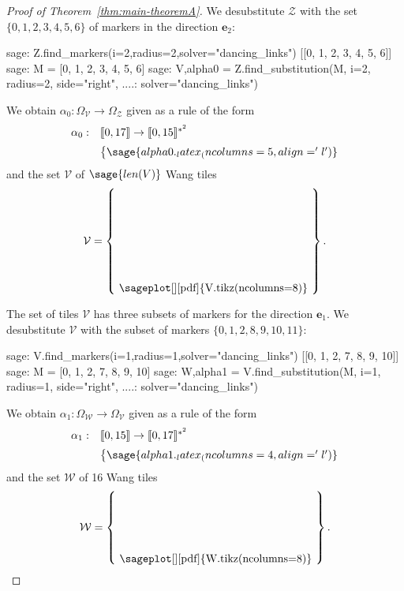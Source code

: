 \documentclass[12pt]{amsart}
\newcommand{\be}{{\boldsymbol{e}}}
\newcommand{\Vcal}{\mathcal{V}}
\newcommand{\Wcal}{\mathcal{W}}
\newcommand{\Zcal}{\mathcal{Z}}
\newcommand{\Zrange}[1]{\llbracket0,#1\rrbracket}
\begin{document}
\begin{proof}[Proof of Theorem~\ref{thm:main-theoremA}]
    We desubstitute $\Zcal$ with the set $\{0, 1, 2, 3, 4, 5, 6\}$
    of markers in the direction $\be_2$:
\begin{sagecommandlinetcb}
\begin{sagecommandline}
sage: Z.find_markers(i=2,radius=2,solver="dancing_links")
[[0, 1, 2, 3, 4, 5, 6]]
sage: M = [0, 1, 2, 3, 4, 5, 6]
sage: V,alpha0 = Z.find_substitution(M, i=2, radius=2, side="right",
....:                                solver="dancing_links")
\end{sagecommandline}
\end{sagecommandlinetcb}
    \noindent
We obtain $\alpha_0:\Omega_\Vcal\to\Omega_\Zcal$ given as a rule of the form
\[
\begin{array}{ll}
    \alpha_0:&\Zrange{17}\to\Zrange{15}^{*^2}\\[2mm]
    &\left\{\arraycolsep=1.8pt
                \sage{alpha0._latex_(ncolumns=5, align='l')}
    \right.
\end{array}
\]
and the set $\Vcal$ of $\sage{len(V)}$ Wang tiles
\[
\Vcal = \left\{\raisebox{-15mm}{
    \sageplot[][pdf]{V.tikz(ncolumns=8)}
}\right\}.
\]

The set of tiles $\Vcal$ has three subsets of markers for the direction
    $\be_1$.
We desubstitute $\Vcal$ with the subset of markers
$\{0, 1, 2, 8, 9, 10, 11\}$:
\begin{sagecommandlinetcb}
\begin{sagecommandline}
sage: V.find_markers(i=1,radius=1,solver="dancing_links")
[[0, 1, 2, 7, 8, 9, 10]]
sage: M = [0, 1, 2, 7, 8, 9, 10]
sage: W,alpha1 = V.find_substitution(M, i=1, radius=1, side="right",
....:                                solver="dancing_links")
\end{sagecommandline}
\end{sagecommandlinetcb}
    \noindent
We obtain $\alpha_1:\Omega_\Wcal\to\Omega_\Vcal$ given as a rule of the form
\[
\begin{array}{ll}
    \alpha_1:&\Zrange{15}\to\Zrange{17}^{*^2}\\[2mm]
    &\left\{\arraycolsep=1.8pt
            \sage{alpha1._latex_(ncolumns=4, align='l')}
     \right.
\end{array}
\]
and the set $\Wcal$ of 16 Wang tiles
\[
\Wcal = \left\{\raisebox{-10mm}{
    \sageplot[][pdf]{W.tikz(ncolumns=8)}
}\right\}.
\]


\end{proof}
\end{document}
